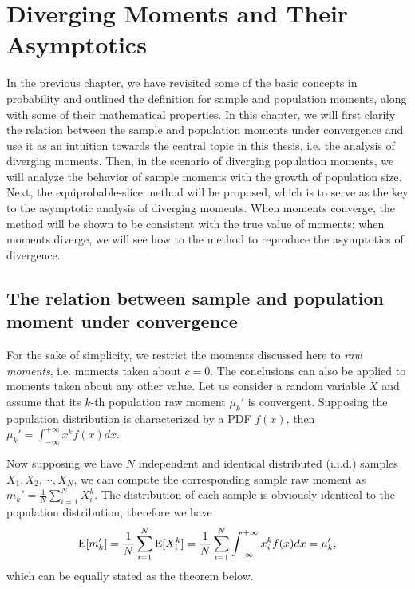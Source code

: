 
\chapter{Diverging Moments and Their Asymptotics}
In the previous chapter, we have revisited some of the basic concepts in probability and outlined the definition for sample and population moments, along with some of their mathematical properties. In this chapter, we will first clarify the relation between the sample and population moments under convergence and use it as an intuition towards the central topic in this thesis, i.e. the analysis of diverging moments. Then, in the scenario of diverging population moments, we will analyze the behavior of sample moments with the growth of population size. Next, the equiprobable-slice method will be proposed, which is to serve as the key to the asymptotic analysis of diverging moments. When moments converge, the method will be shown to be consistent with the true value of moments; when moments diverge, we will see how to the method to reproduce the asymptotics of divergence.

\section{The relation between sample and population moment under convergence}
For the sake of simplicity, we restrict the moments discussed here to \textit{raw moments}, i.e. moments taken about $ c=0 $. The conclusions can also be applied to moments taken about any other value. Let us consider a random variable $ X $ and assume that its $ k $-th population raw moment $ \mu_k' $  is convergent. Supposing the population distribution is characterized by a PDF $ f(x) $, then $ \mu_k' = \int_{-\infty}^{+\infty} x^kf(x)dx $.

Now supposing we have $ N $ independent and identical distributed (i.i.d.) samples $ X_1, X_2, \cdots, X_N $, we can compute the corresponding sample raw moment as $ m_k' = \frac{1}{N} \sum_{i=1}^N X_i^k $. The distribution of each sample is obviously identical to the population distribution, therefore we have 
\begin{equation*}
\E[m_k'] = \frac{1}{N} \sum_{i=1}^N \E[X_i^k] = \frac{1}{N} \sum_{i=1}^N \int_{-\infty}^{+\infty} x_i^k f(x) dx = \mu_k',
\end{equation*}
which can be equally stated as the theorem below.

